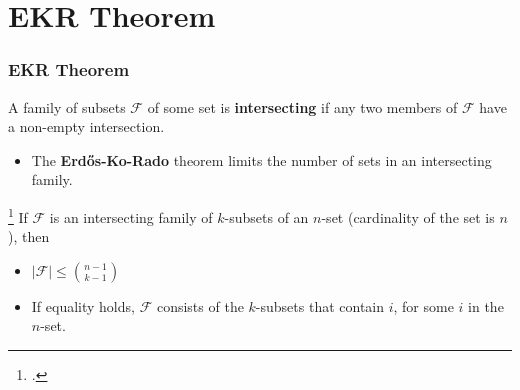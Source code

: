 \documentclass[10pt,]{beamer}
\theoremstyle{mystyle}
\begin{document}
\section{EKR Theorem}
\begin{frame}\frametitle{EKR Theorem}
    \begin{definition}
        A family of subsets $\mathcal{F}$ of some set is \textbf{intersecting} if any two members of $\mathcal{F}$ have a non-empty intersection.
    \end{definition}
    \begin{itemize}
        \item The \textbf{Erd\H{o}s-Ko-Rado}  theorem limits the number of sets in an intersecting family.
    \end{itemize}
    \begin{theorem}
        \footcite{Godsil_Meagher_2015} If $\mathcal{F}$ is an intersecting family of $k$-subsets of an $n$-set (cardinality of the set is $n$), then
        \begin{itemize}
            \item $|\mathcal{F}| \leq \binom{n - 1}{k - 1}$
            \item If equality holds, $\mathcal{F}$ consists of the $k$-subsets that contain $i$, for some $i$ in the $n$-set.
        \end{itemize}
    \end{theorem}
\end{frame}
\end{document}
